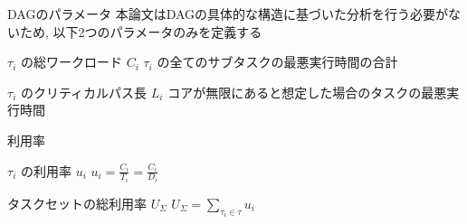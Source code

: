 \begin{frame}{DAGのパラメータ}
    本論文はDAGの具体的な構造に基づいた分析を行う必要がないため, 以下2つのパラメータのみを定義する
    \begin{block}{$\tau_{i}$ の総ワークロード $C_{i}$}
        $\tau_{i}$ の全てのサブタスクの最悪実行時間の合計
    \end{block}
    \begin{block}{$\tau_{i}$ のクリティカルパス長 $L_{i}$}
        コアが無限にあると想定した場合のタスクの最悪実行時間
    \end{block}
\end{frame}

\begin{frame}{利用率}
    \begin{block}{$\tau_{i}$ の利用率 $u_i$}
        $u_i = \frac{C_{i}}{T_{i}}=\frac{C_{i}}{D_{i}}$
    \end{block}
    \begin{block}{タスクセットの総利用率 $U_{\Sigma}$}
        $U_{\Sigma}=\sum_{\tau_{i} \in \tau} u_{i}$
    \end{block}
\end{frame}

